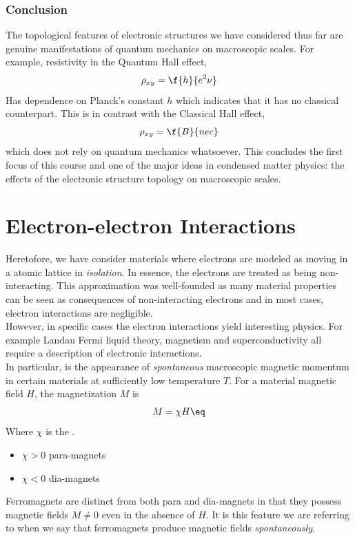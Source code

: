 \documentclass{article}
\begin{document}
\subsubsection{Conclusion}

The topological features of electronic structures we have considered thus far are genuine manifestations of quantum mechanics on macroscopic scales. For example, resistivity in the Quantum Hall effect,
\[ \rho_{xy} = \f{h}{e^2 \nu} \]
Has dependence on Planck's constant $h$ which indicates that it has no classical counterpart. This is in contrast with the Classical Hall effect,
\[ \rho_{xy} = \f{B}{nec} \]
which does not rely on quantum mechanics whatsoever. This concludes the first focus of this course and one of the major ideas in condensed matter physics: the effects of the electronic structure topology on macroscopic scales. \\

\section{Electron-electron Interactions}

Heretofore, we have consider materials where electrons are modeled as moving in a atomic lattice in \textit{isolation}. In essence, the electrons are treated as being non-interacting. This approximation was well-founded as many material properties can be seen as consequences of non-interacting electrons and in most cases, electron interactions are negligible. \\

However, in specific cases the electron interactions yield interesting physics. For example Landau Fermi liquid theory, magnetism and superconductivity all require a description of electronic interactions. \\

In particular,  is the appearance of \textit{spontaneous} macroscopic magnetic momentum in certain materials at sufficiently low temperature $T$. For a material magnetic field $H$, the magnetization $M$ is
\[ M = \chi H \eq \label{eq:linear_susceptibility}\]
Where $\chi$ is the .
\begin{itemize}
    \item $\chi > 0$ para-magnets
    \item $\chi < 0$ dia-magnets
\end{itemize}
Ferromagnets are distinct from both para and dia-magnets in that they possess magnetic fields $M \neq 0$ even in the absence of $H$. It is this feature we are referring to when we say that ferromagnets produce magnetic fields \textit{spontaneously}. \\
\end{document}

